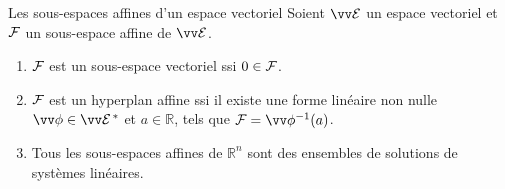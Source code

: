 \documentclass{m53beamer}
\begin{document}
  \begin{frame}{Les sous-espaces affines d'un espace vectoriel}
    Soient $\ev{E}$ un espace vectoriel et $\mathcal{F}$ un sous-espace affine de $\ev{E}$.
    \begin{enumerate}[<+(1)->]
      \item $\mathcal{F}$ est un sous-espace vectoriel ssi $0 \in \mathcal{F}$.
      \item $\mathcal{F}$ est un hyperplan affine ssi il existe une forme linéaire non nulle $\vv\phi\in\ev{E}^{\,*}$ et $a \in \mathbb{R}$, tels que $\ens{F}=\vv\phi^{-1}(a)$.
      \item Tous les sous-espaces affines de $\mathbb{R}^{n}$ sont des ensembles de solutions de systèmes linéaires.
    \end{enumerate}
  \end{frame}
\end{document}
